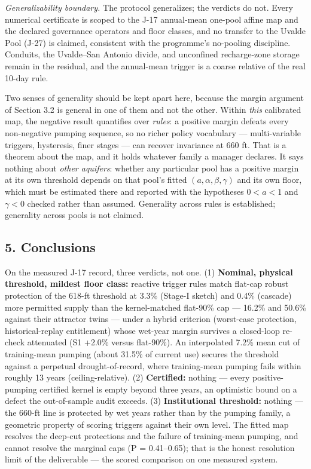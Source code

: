 \emph{Generalizability boundary.} The protocol generalizes; the verdicts
do not. Every numerical certificate is scoped to the J-17 annual-mean
one-pool affine map and the declared governance operators and floor
classes, and no transfer to the Uvalde Pool (J-27) is claimed,
consistent with the programme's no-pooling discipline. Conduits, the
Uvalde--San Antonio divide, and unconfined recharge-zone storage remain
in the residual, and the annual-mean trigger is a coarse relative of the
real 10-day rule.

Two senses of generality should be kept apart here, because the margin
argument of Section 3.2 is general in one of them and not the other.
Within \emph{this} calibrated map, the negative result quantifies over
\emph{rules}: a positive margin defeats every non-negative pumping
sequence, so no richer policy vocabulary --- multi-variable triggers,
hysteresis, finer stages --- can recover invariance at 660 ft. That is a
theorem about the map, and it holds whatever family a manager declares.
It says nothing about \emph{other aquifers}: whether any particular pool
has a positive margin at its own threshold depends on that pool's fitted
\((a, \alpha, \beta, \gamma)\) and its own floor, which must be
estimated there and reported with the hypotheses \(0 < a < 1\) and
\(\gamma < 0\) checked rather than assumed. Generality across rules is
established; generality across pools is not claimed.

\subsection{5. Conclusions}\label{edw-conclusions}

On the measured J-17 record, three verdicts, not one. (1)
\textbf{Nominal, physical threshold, mildest floor class:} reactive
trigger rules match flat-cap robust protection of the 618-ft threshold
at 3.3\% (Stage-I sketch) and 0.4\% (cascade) more permitted supply than
the kernel-matched flat-90\% cap --- 16.2\% and 50.6\% against their
attractor twins --- under a hybrid criterion (worst-case protection,
historical-replay entitlement) whose wet-year margin survives a
closed-loop re-check attenuated (S1 +2.0\% versus flat-90\%). An
interpolated 7.2\% mean cut of training-mean pumping (about 31.5\% of
current use) secures the threshold against a perpetual
drought-of-record, where training-mean pumping fails within roughly 13
years (ceiling-relative). (2) \textbf{Certified:} nothing --- every
positive-pumping certified kernel is empty beyond three years, an
optimistic bound on a defect the out-of-sample audit exceeds. (3)
\textbf{Institutional threshold:} nothing --- the 660-ft line is
protected by wet years rather than by the pumping family, a geometric
property of scoring triggers against their own level. The fitted map
resolves the deep-cut protections and the failure of training-mean
pumping, and cannot resolve the marginal caps (P = 0.41--0.65); that is
the honest resolution limit of the deliverable --- the scored comparison
on one measured system.

